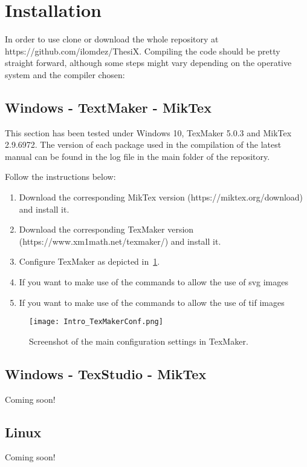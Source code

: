 \section{Installation} %
In order to use \ThesiX{} clone or download the whole repository at https://github.com/ilomdez/ThesiX. Compiling the code should be pretty straight forward, although some steps might vary depending on the operative system and the compiler chosen:

\subsection{Windows - TextMaker - MikTex}
This section has been tested under Windows 10, TexMaker 5.0.3 and MikTex 2.9.6972. The version of each package used in the compilation of the latest \ThesiX{} manual can be found in the log file in the main folder of the repository.

Follow the instructions below:
\begin{enumerate}
	\item Download the corresponding MikTex version (https://miktex.org/download) and install it.
	\item Download the corresponding TexMaker version (https://www.xm1math.net/texmaker/) and install it.
	\item Configure TexMaker as depicted in \fig\,\ref{fig:Intro_TexMakerConf}.
	\item If you want to make use of the commands to allow the use of svg images
	\item If you want to make use of the commands to allow the use of tif images

\end{enumerate}

\begin{figure}[h]
    \centering
    \texttt{[image: Intro\_TexMakerConf.png]}
    \caption[Screenshot of the main configuration settings in TexMaker.]{Screenshot of the main configuration settings in TexMaker.}
    \label{fig:Intro_TexMakerConf}    
\end{figure}

\subsection{Windows - TexStudio - MikTex}
Coming soon!

\subsection{Linux}
Coming soon!

